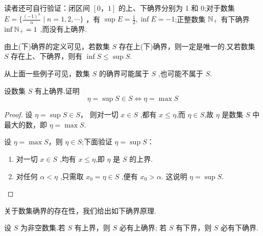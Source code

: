 读者还可自行验证：闭区间 $[0，1]$ 的上、下确界分别为 1 和 0;对于数集 $E=\{\frac{(-1)^n}{n} \mid n=1,2,\cdots\}$ ，有 $\sup E=\frac{1}{2},\inf E =-1$;正整数集 $\mathbb{N}_+$ 有下确界 $\inf \mathbb{N}_+=1$ ,而没有上确界.

\begin{annotation}
    由上(下)确界的定义可见，若数集 $S$ 存在上(下)确界，则一定是唯一的.又若数集 $S$ 存在上、下确界，则有 $\inf S \le \sup S$.
\end{annotation}
\begin{annotation}
    从上面一些例子可见，数集 $S$ 的确界可能属于 $S$ ,也可能不属于 $S$.
\end{annotation}

\begin{example}[确界与最值]
    设数集 $S$ 有上确界.证明
    \[
    \eta = \sup S \in S \iff \eta = \max S
    \]
\end{example}

\begin{proof}
    \renewcommand{\theenumi}{\roman{enumi}}
    \renewcommand{\labelenumi}{\normalfont (\theenumi)}
    \biyao 设 $\eta = \sup S \in S$， 则对一切 $x\in S$ ,都有 $x\le \eta$,而 $\eta\in S$,故 $\eta$ 是数集 $S$ 中最大的数，即 $\eta=\max S$.

    \chongfen 设 $\eta=\max S$，则 $\eta\in S$;下面验证 $\eta = \sup S$：
    \begin{enumerate}
        \item 对一切 $x \in S$ ,均有 $x\le \eta$,即 $\eta$ 是 $S$ 的上界.
        \item 对任何 $\alpha < \eta$ ,只需取 $x_0=\eta\in S$ ,便有 $x_0>\alpha$. 这说明 $\eta=\sup S$.
    \end{enumerate}
\end{proof}

关于数集确界的存在性，我们给出如下确界原理.

\begin{theorem}[确界原理]
    设 $S$ 为非空数集.若 $S$ 有上界，则 $S$ 必有上确界; 若 $S$ 有下界，则 $S$ 必有下确界.
\end{theorem}

